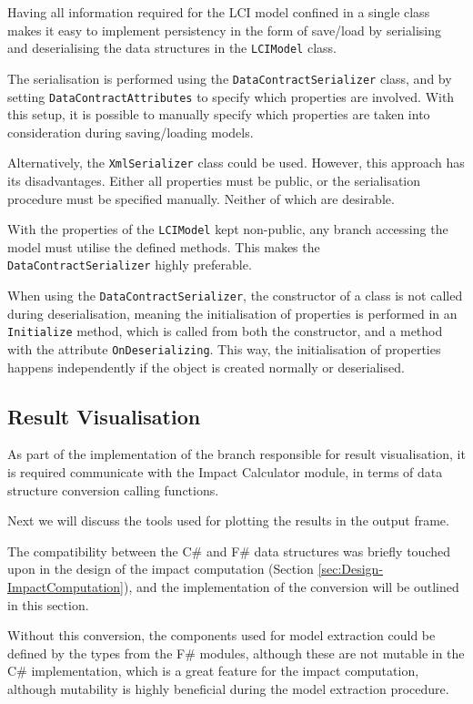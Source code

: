 Having all information required for the LCI model confined in a single class makes it easy to implement persistency in the form of save/load by serialising and deserialising the data structures in the \texttt{LCIModel} class. 

The serialisation is performed using the \texttt{DataContractSerializer} class, and by setting \texttt{DataContractAttributes} to specify which properties are involved. With this setup, it is possible to manually specify which properties are taken into consideration during saving/loading models. 

Alternatively, the \texttt{XmlSerializer} class could be used. However, this approach has its disadvantages. Either all properties must be public, or the serialisation procedure must be specified manually. Neither of which are desirable.

With the properties of the \texttt{LCIModel} kept non-public, any branch accessing the model must utilise the defined methods. This makes the \texttt{DataContractSerializer} highly preferable.

When using the \texttt{DataContractSerializer}, the constructor of a class is not called during deserialisation, meaning the initialisation of properties is performed in an \texttt{Initialize} method, which is called from both the constructor, and a method with the attribute \texttt{OnDeserializing}. This way, the initialisation of properties happens independently if the object is created normally or deserialised. 

\subsection{Result Visualisation} \label{ssec:Implementation-ResultVisualisation}
As part of the implementation of the branch responsible for result visualisation, it is required communicate with the Impact Calculator module, in terms of data structure conversion calling functions. 

Next we will discuss the tools used for plotting the results in the output frame. 

The compatibility between the C\# and F\# data structures was briefly touched upon in the design of the impact computation (Section \ref{sec:Design-ImpactComputation}), and the implementation of the conversion will be outlined in this section.

Without this conversion, the components used for model extraction could be defined by the types from the F\# modules, although these are not mutable in the C\# implementation, which is a great feature for the impact computation, although mutability is highly beneficial during the model extraction procedure. 


